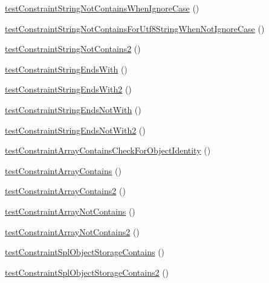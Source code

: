 \begin{DoxyCompactItemize}
\item 
\mbox{\hyperlink{class_framework___constraint_test_a4500433b7d74f8389b8efa61cc4a8ab0}{test\+Constraint\+String\+Not\+Contains\+When\+Ignore\+Case}} ()
\item 
\mbox{\hyperlink{class_framework___constraint_test_ab4448c22f3e3614e31ba62cd59741256}{test\+Constraint\+String\+Not\+Contains\+For\+Utf8\+String\+When\+Not\+Ignore\+Case}} ()
\item 
\mbox{\hyperlink{class_framework___constraint_test_a1a77136c510851eaf50da3008a9bd60a}{test\+Constraint\+String\+Not\+Contains2}} ()
\item 
\mbox{\hyperlink{class_framework___constraint_test_a545313dfd1d507b36a64b28ad9418b56}{test\+Constraint\+String\+Ends\+With}} ()
\item 
\mbox{\hyperlink{class_framework___constraint_test_a05042b91f6b7020e07c46516e50953af}{test\+Constraint\+String\+Ends\+With2}} ()
\item 
\mbox{\hyperlink{class_framework___constraint_test_a203117d3bc44fb093e08d06d25aa144c}{test\+Constraint\+String\+Ends\+Not\+With}} ()
\item 
\mbox{\hyperlink{class_framework___constraint_test_ade7a263f5d9dc9220eab287fbf5f1045}{test\+Constraint\+String\+Ends\+Not\+With2}} ()
\item 
\mbox{\hyperlink{class_framework___constraint_test_a82e65bf2fb41511d5385c7446a50f318}{test\+Constraint\+Array\+Contains\+Check\+For\+Object\+Identity}} ()
\item 
\mbox{\hyperlink{class_framework___constraint_test_a3f0acbda956c2d1865f07896b287065b}{test\+Constraint\+Array\+Contains}} ()
\item 
\mbox{\hyperlink{class_framework___constraint_test_a7a188fd394ba17303eb1987185173467}{test\+Constraint\+Array\+Contains2}} ()
\item 
\mbox{\hyperlink{class_framework___constraint_test_a12fad318e3ea1d8dfe6ced14b41da116}{test\+Constraint\+Array\+Not\+Contains}} ()
\item 
\mbox{\hyperlink{class_framework___constraint_test_a79c23f325ebeb483178d0b54acd0e0da}{test\+Constraint\+Array\+Not\+Contains2}} ()
\item 
\mbox{\hyperlink{class_framework___constraint_test_a2f98fdab0ed344b60400e4f5803cd482}{test\+Constraint\+Spl\+Object\+Storage\+Contains}} ()
\item 
\mbox{\hyperlink{class_framework___constraint_test_a9ffd9e19d935adac399b63917fb32efb}{test\+Constraint\+Spl\+Object\+Storage\+Contains2}} ()
\item 

\end{DoxyCompactItemize}
